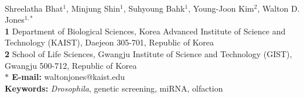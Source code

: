 \begin{flushleft}
\\
Shreelatha Bhat$^{1}$, 
Minjung Shin$^{1}$, 
Suhyoung Bahk$^{1}$, 
Young-Joon Kim$^{2}$, 
Walton D. Jones$^{1,\ast}$
\\
{\bf 1} Department of Biological Sciences, Korea Advanced Institute of Science and Technology (KAIST), Daejeon 305-701, Republic of Korea
\\
{\bf 2} School of Life Sciences, Gwangju Institute of Science and Technology (GIST), Gwangju 500-712, Republic of Korea
\\
{\bf $\ast$ E-mail:} waltonjones@kaist.edu
\\
{\bf Keywords:} \emph{Drosophila}, genetic screening, miRNA, olfaction
\end{flushleft}